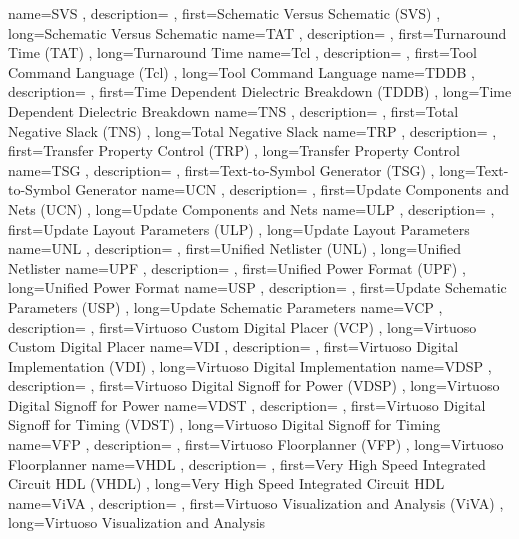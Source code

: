 { name={SVS}
, description={}
, first={Schematic Versus Schematic (SVS)}
, long={Schematic Versus Schematic}
}
{ name={TAT}
, description={}
, first={Turnaround Time (TAT)}
, long={Turnaround Time}
}
{ name={Tcl}
, description={}
, first={Tool Command Language (Tcl)}
, long={Tool Command Language}
}
{ name={TDDB}
, description={}
, first={Time Dependent Dielectric Breakdown (TDDB)}
, long={Time Dependent Dielectric Breakdown}
}
{ name={TNS}
, description={}
, first={Total Negative Slack (TNS)}
, long={Total Negative Slack}
}
{ name={TRP}
, description={}
, first={Transfer Property Control (TRP)}
, long={Transfer Property Control}
}
{ name={TSG}
, description={}
, first={Text-to-Symbol Generator (TSG)}
, long={Text-to-Symbol Generator}
}
{ name={UCN}
, description={}
, first={Update Components and Nets (UCN)}
, long={Update Components and Nets}
}
{ name={ULP}
, description={}
, first={Update Layout Parameters (ULP)}
, long={Update Layout Parameters}
}
{ name={UNL}
, description={}
, first={Unified Netlister (UNL)}
, long={Unified Netlister}
}
{ name={UPF}
, description={}
, first={Unified Power Format (UPF)}
, long={Unified Power Format}
}
{ name={USP}
, description={}
, first={Update Schematic Parameters (USP)}
, long={Update Schematic Parameters}
}
{ name={VCP}
, description={}
, first={Virtuoso Custom Digital Placer (VCP)}
, long={Virtuoso Custom Digital Placer}
}
{ name={VDI}
, description={}
, first={Virtuoso Digital Implementation (VDI)}
, long={Virtuoso Digital Implementation}
}
{ name={VDSP}
, description={}
, first={Virtuoso Digital Signoff for Power (VDSP)}
, long={Virtuoso Digital Signoff for Power}
}
{ name={VDST}
, description={}
, first={Virtuoso Digital Signoff for Timing (VDST)}
, long={Virtuoso Digital Signoff for Timing}
}
{ name={VFP}
, description={}
, first={Virtuoso Floorplanner (VFP)}
, long={Virtuoso Floorplanner}
}
{ name={VHDL}
, description={}
, first={Very High Speed Integrated Circuit HDL (VHDL)}
, long={Very High Speed Integrated Circuit HDL}
}
{ name={ViVA}
, description={}
, first={Virtuoso Visualization and Analysis (ViVA)}
, long={Virtuoso Visualization and Analysis}
}
